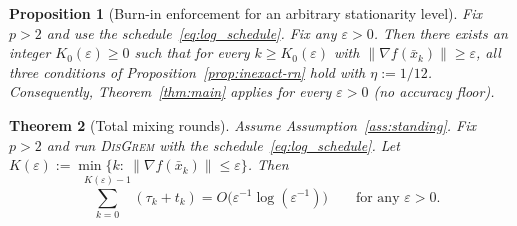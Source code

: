 \documentclass[11pt,a4paper]{article}
\def\cO{O}%
\newtheorem{theorem}{Theorem}[section]
\newtheorem{proposition}[theorem]{Proposition}
\newcommand{\cO}{\mathcal{O}}
\begin{document}
\begin{proposition}[Burn-in enforcement for an arbitrary stationarity level]\label{prop:burnin_enforce}
	Fix $p>2$ and use the schedule~\eqref{eq:log_schedule}.
	Fix any $\varepsilon>0$.
	Then there exists an integer $K_0(\varepsilon)\ge 0$ such that
	for every $k\ge K_0(\varepsilon)$ with $\|\nabla f(\bar x_k)\|\ge \varepsilon$,
	all three conditions of Proposition~\ref{prop:inexact-rn} hold with $\eta:=1/12$.
	Consequently, Theorem~\ref{thm:main} applies for every $\varepsilon>0$ (no accuracy floor).
\end{proposition}

\begin{theorem}[Total mixing rounds]\label{thm:comm}
	Assume Assumption~\ref{ass:standing}. Fix $p>2$ and run \textsc{DisGrem} with the schedule~\eqref{eq:log_schedule}.
	Let $K(\varepsilon):=\min\{k:\ \|\nabla f(\bar x_k)\|\le \varepsilon\}$.
	Then
	\[
	\sum_{k=0}^{K(\varepsilon)-1}(\tau_k+t_k)
	=\cO\bigl(\varepsilon^{-1}\log(\varepsilon^{-1})\bigr)
	\qquad\text{for any }\varepsilon>0.
	\]
\end{theorem}
\end{document}
